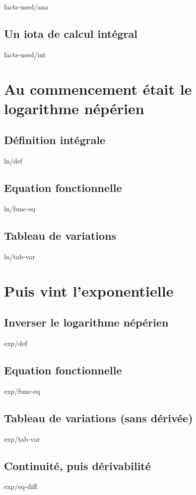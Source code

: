 \documentclass[12pt]{amsart}
\begin{document}
    {facts-used/ana}


    \subsection{Un iota de calcul intégral}

    {facts-used/int}




\section{Au commencement était le logarithme népérien}

    \subsection{Définition intégrale}

    {ln/def}


    \subsection{Equation fonctionnelle}

    {ln/func-eq}


    \subsection{Tableau de variations}

    {ln/tab-var}




\section{Puis vint l'exponentielle}

    \subsection{Inverser le logarithme népérien}

    {exp/def}


    \subsection{Equation fonctionnelle}

    {exp/func-eq}


    \subsection{Tableau de variations (sans dérivée)}

    {exp/tab-var}


    \subsection{Continuité, puis dérivabilité}

    {exp/eq-diff}
\end{document}
